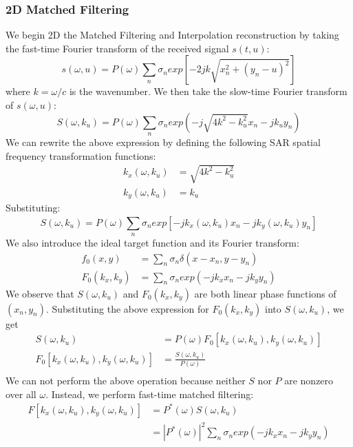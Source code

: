 \documentclass{article}
\begin{document}
\subsubsection*{2D Matched Filtering}
We begin 2D the Matched Filtering and Interpolation reconstruction by taking the fast-time Fourier transform of the received signal \( s(t,u) \):
\begin{displaymath}
	s( \omega , u) = P( \omega) \sum\limits_{n}^{} \sigma_{n} exp\left[ -2jk \sqrt{x_{n}^2 +(y_{n} - u)^2} \right]
\end{displaymath}
where \( k = \omega / c \) is the wavenumber. We then take the slow-time Fourier transform of \( s( \omega , u) \):
\begin{displaymath}
	S( \omega , k_{u}) = P(\omega) \sum\limits_{n}^{} \sigma_{n}exp(-j \sqrt{4 k^2 - k_{u}^2} x_{n} - j k_{u} y_{n} ) 
\end{displaymath}
We can rewrite the above expression by defining the following SAR spatial frequency transformation functions:
\begin{align*}
	k_{x}(\omega , k_{u}) &= \sqrt{4 k^2 - k_{u}^2} \\
	k_{y}(\omega , k_{u}) &= k_{u}
\end{align*}
Substituting:
\begin{displaymath}
	S( \omega , k_{u}) = P(\omega) \sum\limits_{n}^{} \sigma_{n}exp[-j k_{x}(\omega , k_{u} ) x_{n} - j k_{y}(\omega , k_{u}) y_{n} ]
\end{displaymath}
We also introduce the ideal target function and its Fourier transform:
\begin{align*}
	f_0(x,y) &= \sum\limits_{n}^{} \sigma_{n} \delta(x - x_{n} , y - y_{n}) \\
	F_0(k_{x} , k_{y}) &= \sum\limits_{n}^{} \sigma_{n} exp(-j k_{x} x_{n} - j k_{y} y_{n}) 
\end{align*}
We observe that \( S(\omega , k_{u}) \) and \( F_0(k_{x} , k_{y}) \) are both linear phase functions of \((x_{n}, y_{n} )  \). Substituting the above expression for \( F_0(k_{x} , k_{y}) \) into \( S(\omega , k_{u}) \), we get
\begin{align*}
	S(\omega , k_{u}) &= P(\omega) F_0 [k_{x}(\omega , k_{u}) , k_{y}(\omega , k_{u}) ] \\
	F_0 [k_{x}(\omega , k_{u}) , k_{y}(\omega , k_{u}) ] &= \frac{S(\omega , k_{u})}{P(\omega)}\\
\end{align*}
We can not perform the above operation because neither \( S \) nor \( P \) are nonzero over all \( \omega \). Instead, we perform fast-time matched filtering:
\begin{align*}
	F [k_{x}(\omega , k_{u}) , k_{y}(\omega , k_{u}) ] &= P^{*}(\omega) S(\omega , k_{u}) \\
														 &= |P^{*}(\omega)|^2 \sum\limits_{n}^{} \sigma_{n} exp(-j k_{x} x_{n} - j k_{y} y_{n})
\end{align*}
\end{document}
